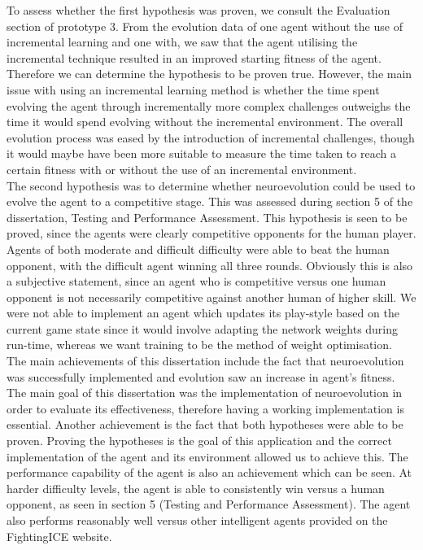 \documentclass[12pt,a4paper]{article}
\begin{document}
To assess whether the first hypothesis was proven, we consult the Evaluation section of prototype 3. From the evolution data of one agent without the use of incremental learning and one with, we saw that the agent utilising the incremental technique resulted in an improved starting fitness of the agent. Therefore we can determine the hypothesis to be proven true. However, the main issue with using an incremental learning method is whether the time spent evolving the agent through incrementally more complex challenges outweighs the time it would spend evolving without the incremental environment. The overall evolution process was eased by the introduction of incremental challenges, though it would maybe have been more suitable to measure the time taken to reach a certain fitness with or without the use of an incremental environment.\\

The second hypothesis was to determine whether neuroevolution could be used to evolve the agent to a competitive stage. This was assessed during section 5 of the dissertation, Testing and Performance Assessment. This hypothesis is seen to be proved, since the agents were clearly competitive opponents for the human player. Agents of both moderate and difficult difficulty were able to beat the human opponent, with the difficult agent winning all three rounds. Obviously this is also a subjective statement, since an agent who is competitive versus one human opponent is not necessarily competitive against another human of higher skill. We were not able to implement an agent which updates its play-style based on the current game state since it would involve adapting the network weights during run-time, whereas we want training to be the method of weight optimisation.\\
\newpage
The main achievements of this dissertation include the fact that neuroevolution was successfully implemented and evolution saw an increase in agent's fitness. The main goal of this dissertation was the implementation of neuroevolution in order to evaluate its effectiveness, therefore having a working implementation is essential. Another achievement is the fact that both hypotheses were able to be proven. Proving the hypotheses is the goal of this application and the correct implementation of the agent and its environment allowed us to achieve this. The performance capability of the agent is also an achievement which can be seen. At harder difficulty levels, the agent is able to consistently win versus a human opponent, as seen in section 5 (Testing and Performance Assessment). The agent also performs reasonably well versus other intelligent agents provided on the FightingICE website.\\
\end{document}
